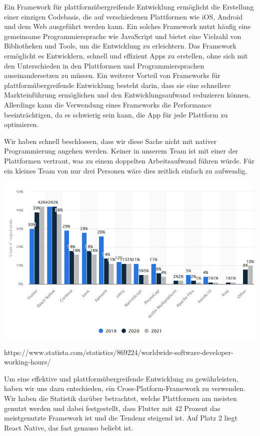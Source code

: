 Ein Framework für plattformübergreifende Entwicklung ermöglicht die Erstellung einer einzigen Codebasis, die auf verschiedenen Plattformen wie iOS, Android und dem Web ausgeführt werden kann. Ein solches Framework nutzt häufig eine gemeinsame Programmiersprache wie JavaScript und bietet eine Vielzahl von Bibliotheken und Tools, um die Entwicklung zu erleichtern. Das Framework ermöglicht es Entwicklern, schnell und effizient Apps zu erstellen, ohne sich mit den Unterschieden in den Plattformen und Programmiersprachen auseinandersetzen zu müssen. Ein weiterer Vorteil von Frameworks für plattformübergreifende Entwicklung besteht darin, dass sie eine schnellere Markteinführung ermöglichen und den Entwicklungsaufwand reduzieren können. Allerdings kann die Verwendung eines Frameworks die Performance beeinträchtigen, da es schwierig sein kann, die App für jede Plattform zu optimieren.

Wir haben schnell beschlossen, dass wir diese Sache nicht mit nativer Programmierung angehen werden. Keiner in unserem Team ist mit einer der Plattformen vertraut, was zu einem doppelten Arbeitsaufwand führen würde. Für ein kleines Team von nur drei Personen wäre dies zeitlich einfach zu aufwendig.

\includegraphics[width=1\textwidth]{pics/cross-platform-statisitics.png}

https://www.statista.com/statistics/869224/worldwide-software-developer-working-hours/

Um eine effektive und plattformübergreifende Entwicklung zu gewährleisten, haben wir uns dazu entschieden, ein Cross-Platform-Framework zu verwenden. Wir haben die Statistik darüber betrachtet, welche Plattformen am meisten genutzt werden und dabei festgestellt, dass Flutter mit 42 Prozent das meistgenutzte Framework ist und die Tendenz steigend ist. Auf Platz 2 liegt React Native, das fast genauso beliebt ist.

